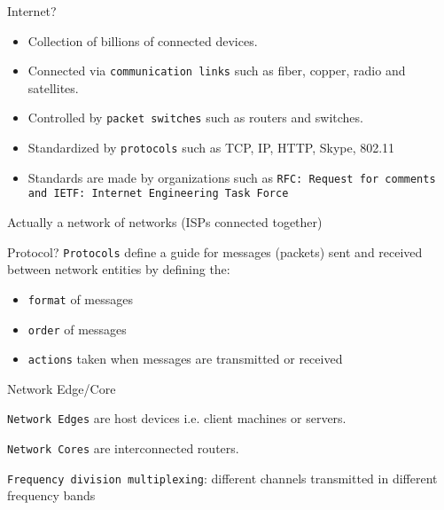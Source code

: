 \begin{topic}{Internet?}

\begin{itemize}
\item Collection of billions of connected devices.
\item Connected via \texttt{communication links} such as fiber, copper, radio and satellites.
\item Controlled by \texttt{packet switches} such as routers and switches.

\item Standardized by \texttt{protocols} such as TCP, IP, HTTP, Skype, 802.11

\item Standards are made by organizations such as \texttt{RFC: Request for comments and IETF: Internet Engineering Task Force}
\end{itemize}

\begin{subtopic}{2}
Actually a network of networks (ISPs connected together)
\end{subtopic}

\end{topic}

\begin{topic}{Protocol?}
\texttt{Protocols} define a guide for messages (packets) sent and received between network entities by defining the:

\begin{itemize}
\item \texttt{format} of messages
\item \texttt{order} of messages
\item \texttt{actions} taken when messages are transmitted or received
\end{itemize}

\end{topic}

\begin{topic}{Network Edge/Core}

\texttt{Network Edges} are host devices i.e. client machines or servers.

\texttt{Network Cores} are interconnected routers.

\begin{subtopic}{2}
\texttt{Frequency division multiplexing}: different channels transmitted in different frequency bands
\end{subtopic}

\end{topic}